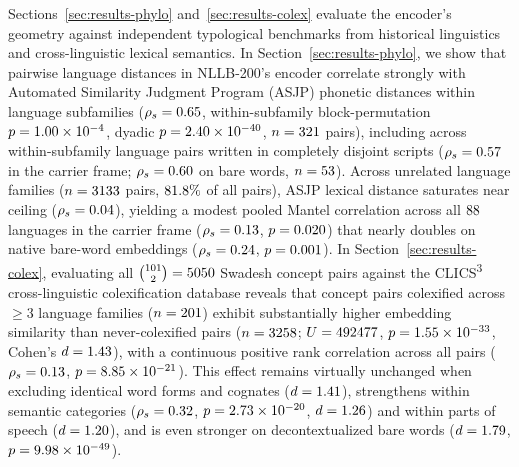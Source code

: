 Sections~\ref{sec:results-phylo} and~\ref{sec:results-colex} evaluate the encoder's geometry against independent typological benchmarks from historical linguistics and cross-linguistic lexical semantics.
In Section~\ref{sec:results-phylo}, we show that pairwise language distances in NLLB-200's encoder correlate strongly with Automated Similarity Judgment Program (ASJP) phonetic distances \citep{wichmann2022,jaeger2018} within language subfamilies ($\rho_s = 0.65{}$, within-subfamily block-permutation $p = 1.00 \times 10^{-4}{}$, dyadic $p = 2.40 \times 10^{-40}{}$, $n = 321{}$ pairs), including across within-subfamily language pairs written in completely disjoint scripts ($\rho_s = 0.57{}$ in the carrier frame; $\rho_s = 0.60{}$ on bare words, $n = 53{}$).
Across unrelated language families ($n = 3133{}$ pairs, $81.8{}\%$ of all pairs), ASJP lexical distance saturates near ceiling ($\rho_s = 0.04{}$), yielding a modest pooled Mantel correlation across all $88{}$ languages in the carrier frame ($\rho_s = 0.13{}$, $p = 0.020{}$) that nearly doubles on native bare-word embeddings ($\rho_s = 0.24{}$, $p = 0.001{}$).
In Section~\ref{sec:results-colex}, evaluating all $\binom{101}{2} = 5050{}$ Swadesh concept pairs against the CLICS\textsuperscript{3} cross-linguistic colexification database \citep{list2018,rzymski2020} reveals that concept pairs colexified across $\ge 3$ language families ($n = 201{}$) exhibit substantially higher embedding similarity than never-colexified pairs ($n = 3258{}$; $U = 492477{}$, $p = 1.55 \times 10^{-33}{}$, Cohen's $d = 1.43{}$), with a continuous positive rank correlation across all \ColexNumPairs{} pairs ($\rho_s = 0.13{}$, $p = 8.85 \times 10^{-21}{}$).
This effect remains virtually unchanged when excluding identical word forms and cognates ($d = 1.41{}$), strengthens within semantic categories ($\rho_s = 0.32{}$, $p = 2.73 \times 10^{-20}{}$, $d = 1.26{}$) and within parts of speech ($d = 1.20{}$), and is even stronger on decontextualized bare words ($d = 1.79{}$, $p = 9.98 \times 10^{-49}{}$).

